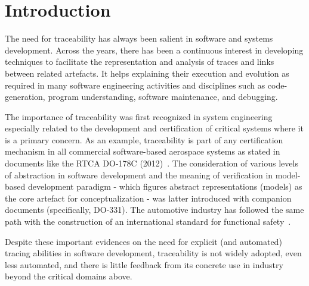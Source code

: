 \section{Introduction} \label{sec:intro}

The need for traceability has always been salient in software and systems development. Across the years, there has been a continuous interest in developing techniques to facilitate the representation and analysis of traces and links between related artefacts. It helps explaining their execution and evolution as required  in many software engineering activities and disciplines such as code-generation, program understanding, software maintenance, and debugging. 

The importance of traceability was first recognized in system engineering especially related to the development and certification of critical systems where it is a primary concern. As an example, traceability is part of any certification mechanism in all commercial software-based aerospace systems as stated in documents like the RTCA DO-178C (2012)~\cite{paz2019-Modelling-Avionics-Certification,moy2013-DO-178C-testing}. The consideration of various levels of abstraction in software development and the meaning of verification in model-based development paradigm - which figures abstract representations (models) as the core artefact for conceptualization -  was latter introduced with companion documents (specifically, DO-331). The automotive industry has followed the same path with the construction of an international standard for functional safety~\cite{iso26262}. %

Despite these important evidences on the need for explicit (and automated) tracing abilities in software development, traceability is not widely adopted, even less automated, and there is little feedback from its concrete use in industry~\cite{panis2010-req-traceability-deployment-in-commercial-engineering-organisation} beyond the critical domains above. 

